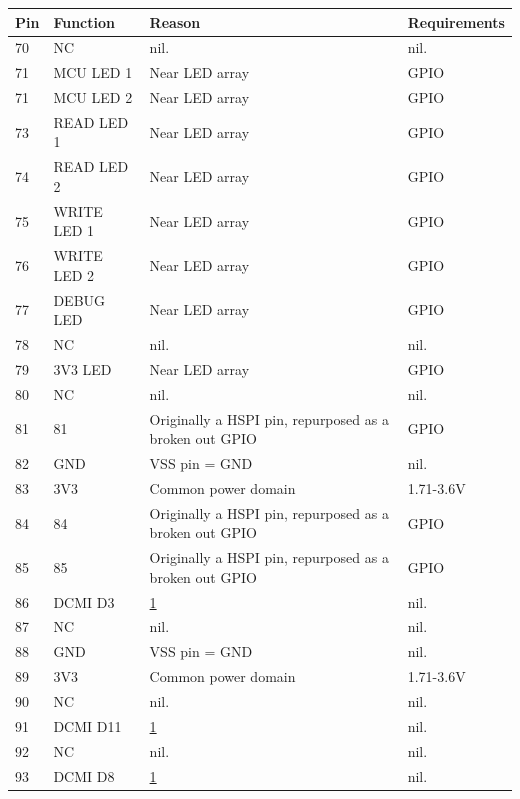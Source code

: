 \begin{table}[H]
    \ContinuedFloat
    \centering
    \begin{tabular}{|l|p{3cm}|p{6.5cm}|p{3.5cm}|}
        \hline
        \textbf{Pin} & \textbf{Function} & \textbf{Reason} & \textbf{Requirements} \\
        \hline
        70 & NC & nil. & nil. \\ \hline
        71 & MCU LED 1 & Near LED array & GPIO \\ \hline
        71 & MCU LED 2 & Near LED array & GPIO \\ \hline
        73 & READ LED 1 & Near LED array & GPIO \\ \hline
        74 & READ LED 2 & Near LED array & GPIO \\ \hline
        75 & WRITE LED 1 & Near LED array & GPIO \\ \hline
        76 & WRITE LED 2 & Near LED array & GPIO \\ \hline
        77 & DEBUG LED & Near LED array & GPIO \\ \hline
        78 & NC & nil. & nil. \\ \hline
        79 & 3V3 LED & Near LED array & GPIO \\ \hline
        80 & NC & nil. & nil. \\ \hline
        81 & 81 & Originally a HSPI pin, repurposed as a broken out GPIO & GPIO \\ \hline
        82 & GND & VSS pin = GND & nil. \\ \hline
        83 & 3V3 & Common power domain & 1.71-3.6V \\ \hline
        84 & 84 & Originally a HSPI pin, repurposed as a broken out GPIO & GPIO \\ \hline
        85 & 85 & Originally a HSPI pin, repurposed as a broken out GPIO & GPIO \\ \hline
        86 & DCMI D3 & \hyperlink{dcmi-reason}{1} & nil. \\ \hline
        87 & NC & nil. & nil. \\ \hline
        88 & GND & VSS pin = GND & nil. \\ \hline
        89 & 3V3 & Common power domain & 1.71-3.6V \\ \hline
        90 & NC & nil. & nil. \\ \hline
        91 & DCMI D11 & \hyperlink{dcmi-reason}{1} & nil. \\ \hline
        92 & NC & nil. & nil. \\ \hline
        93 & DCMI D8 & \hyperlink{dcmi-reason}{1} & nil. \\ \hline

\end{tabular}
\end{table}
